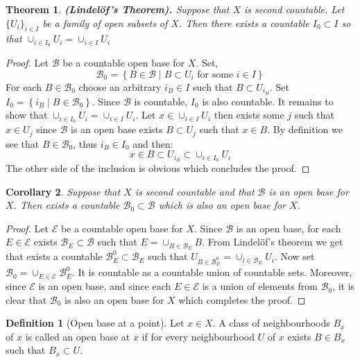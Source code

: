 \documentclass[11pt,a4paper]{article}
\theoremstyle{definition}
\newtheorem{definition}{Definition}[section]
\theoremstyle{plain}
\newtheorem{theorem}{Theorem}[section]
\newtheorem{corollary}[theorem]{Corollary}
\newcommand{\set}[2]{ \left\{ #1 \mid #2 \right\} }
\renewcommand{\tt}[1]{\textnormal{\textbf{(#1).}}} %
\begin{document}
  \begin{theorem}
    \tt{Lindelöf’s Theorem} Suppose that $X$ is second countable. Let
    $\{U_i\}_{i \in I}$ be a family of open subsets of $X$. Then there
    exists a countable $I_0 \subset I$ so that 
    $\cup_{i \in I_{0}}{U_i} = \cup_{i \in I}{U_i}$
  \end{theorem}
  \begin{proof}
    Let $\mathcal{B}$ be a countable open base for $X$. Set,
    \[
      \mathcal{B}_0 = \set{B \in \mathcal{B}}{B \subset U_i
      \text{ for some } i \in I}
    \]
    For each $B \in \mathcal{B}_0$ choose an arbitrary $i_B \in I$ such
    that $B \subset U_{i_B}$. Set $I_0 = \set{i_B}{B \in \mathcal{B}_0}$.
    Since $\mathcal{B}$ is countable, $I_0$ is also countable. It remains
    to show that $\cup_{i \in I_{0}}{U_i} = \cup_{i \in I}{U_i}$. Let
    $x \in \cup_{i \in I}{U_i}$ then exists some $j$ such that $x \in U_j$
    since $\mathcal{B}$ is an open base exists $B \subset U_j$ such that
    $x \in B$. By definition we see that $B \in \mathcal{B}_0$, thus
    $i_B \in I_0$ and then:
    \[
      x \in B \subset U_{i_B} \subset \cup_{i \in I_{0}}{U_i}
    \]
    The other side of the inclusion is obvious which concludes the proof.
  \end{proof}

  \begin{corollary}
    Suppose that $X$ is second countable and that $\mathcal{B}$ is an open
    base for $X$. Then exists a countable $\mathcal{B}_0 \subset \mathcal{B}$ 
    which is also an open base for $X$.
  \end{corollary}
  \begin{proof}
    Let $\mathcal{E}$ be a countable open base for $X$. Since $\mathcal{B}$
    is an open base, for each $E \in \mathcal{E}$ exists 
    $\mathcal{B}_E \subset \mathcal{B}$ such that 
    $E = \cup_{B \in \mathcal{B}_E} B$. From Lindel\"of's theorem
    we get that exists a countable $\mathcal{B}^0_E \subset \mathcal{B}_E$
    such that $U_{B \in \mathcal{B}^0_E} = \cup_{i \in \mathcal{B}_E}{U_i}$.
    Now set $\mathcal{B}_0 = \cup_{E \in \mathcal{E}}{\mathcal{B}^0_E}$.
    It is countable as a countable union of countable sets. Moreover,
    since $\mathcal{E}$ is an open base, and since each $E \in \mathcal{E}$
    is a union of elements from $\mathcal{B}_0$, it is clear that
    $\mathcal{B}_0$ is also an open base for $X$ which completes the proof.
  \end{proof}

  \begin{definition}[Open base at a point]
    Let $x \in X$. A class of neighbourhoods $B_x$ of $x$ is called an open
    base at $x$ if for every neighbourhood $U$ of $x$ exists $B \in B_x$
    such that $B_x \subset U$.
  \end{definition}
\end{document}
